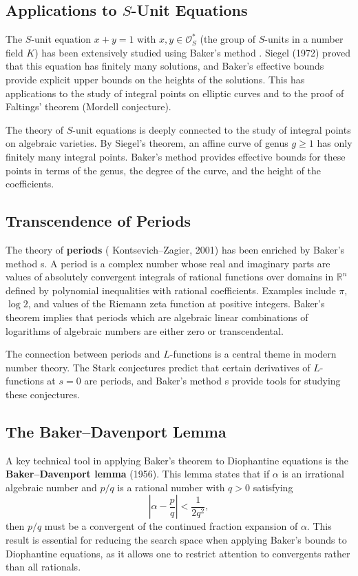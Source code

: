 \subsection*{Applications to $S$-Unit Equations}

The $S$-unit equation $x + y = 1$ with $x, y \in \mathcal{O}_S^*$ (the group of $S$-units in a number field $K$) has been extensively studied using Baker's method \cite{baker1966}. Siegel (1972) proved that this equation has finitely many solutions, and Baker's effective bounds provide explicit upper bounds on the heights of the solutions. This has applications to the study of integral points on elliptic curves and to the proof of Faltings' theorem (Mordell conjecture).

The theory of $S$-unit equations is deeply connected to the study of integral points on algebraic varieties. By Siegel's theorem, an affine curve of genus $g \geq 1$ has only finitely many integral points. Baker's method \cite{baker1966} provides effective bounds for these points in terms of the genus, the degree of the curve, and the height of the coefficients.

\subsection*{Transcendence of Periods}

The theory of \textbf{periods} ( Kontsevich--Zagier, 2001) has been enriched by Baker's method \cite{baker1966}s. A period is a complex number whose real and imaginary parts are values of absolutely convergent integrals of rational functions over domains in $\mathbb{R}^n$ defined by polynomial inequalities with rational coefficients. Examples include $\pi$, $\log 2$, and values of the Riemann zeta function at positive integers. Baker's theorem implies that periods which are algebraic linear combinations of logarithms of algebraic numbers are either zero or transcendental.

The connection between periods and $L$-functions is a central theme in modern number theory. The Stark conjectures predict that certain derivatives of $L$-functions at $s = 0$ are periods, and Baker's method \cite{baker1966}s provide tools for studying these conjectures.

\subsection*{The Baker--Davenport Lemma}

A key technical tool in applying Baker's theorem to Diophantine equations is the \textbf{Baker--Davenport lemma} (1956). This lemma states that if $\alpha$ is an irrational algebraic number and $p/q$ is a rational number with $q > 0$ satisfying
\[
\left|\alpha - \frac{p}{q}\right| < \frac{1}{2q^2},
\]
then $p/q$ must be a convergent of the continued fraction expansion of $\alpha$. This result is essential for reducing the search space when applying Baker's bounds to Diophantine equations, as it allows one to restrict attention to convergents rather than all rationals.


